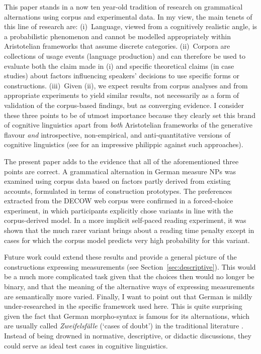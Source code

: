\documentclass[USenglish]{article}
\begin{document}
This paper stands in a now ten year-old tradition of research on grammatical alternations using corpus and experimental data.
In my view, the main tenets of this line of research are:
(i)~Language, viewed from a cognitively realistic angle, is a probabilistic phenomenon and cannot be modelled appropriately within Aristotelian frameworks that assume discrete categories.
(ii)~Corpora are collections of usage events (language production) and can therefore be used to evaluate both the claim made in (i) and specific theoretical claims (in case studies) about factors influencing speakers' decisions to use specific forms or constructions.
(iii)~Given (ii), we expect results from corpus analyses and from appropriate experiments to yield similar results, not necessarily as a form of validation of the corpus-based findings, but as converging evidence.
I consider these three points to be of utmost importance because they clearly set this brand of cognitive linguistics apart from \textit{both} Aristotelian frameworks of the generative flavour \textit{and} introspective, non-empirical, and anti-quantitative versions of cognitive linguistics (see \citealp{Dabrowska2016} for an impressive philippic against such approaches).

The present paper adds to the evidence that all of the aforementioned three points are correct.
A grammatical alternation in German measure NPs was examined using corpus data based on factors partly derived from existing accounts, formulated in terms of construction prototypes.
The preferences extracted from the DECOW web corpus were confirmed in a forced-choice experiment, in which participants explicitly chose variants in line with the corpus-derived model.
In a more implicit self-paced reading experiment, it was shown that the much rarer variant brings about a reading time penalty except in cases for which the corpus model predicts very high probability for this variant.

Future work could extend these results and provide a general picture of the constructions expressing measurements (see Section~\ref{sec:descriptive}).
This would be a much more complicated task given that the choices then would no longer be binary, and that the meaning of the alternative ways of expressing measurements are semantically more varied.
Finally, I want to point out that German is mildly under-researched in the specific framework used here.
This is quite surprising given the fact that German morpho-syntax is famous for its alternations, which are usually called \textit{Zweifelsfälle} (`cases of doubt') in the traditional literature \citep{Duden09,Klein2009}.
Instead of being drowned in normative, descriptive, or didactic discussions, they could serve as ideal test cases in cognitive linguistics.
\end{document}
